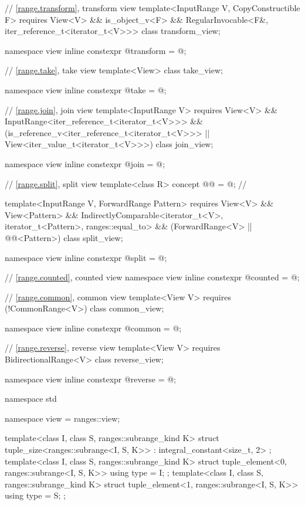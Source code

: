 \begin{codeblock}
{  // \ref{range.transform}, transform view
  template<InputRange V, CopyConstructible F>
    requires View<V> && is_object_v<F> &&
             RegularInvocable<F&, iter_reference_t<iterator_t<V>>>
  class transform_view;

  namespace view { inline constexpr @\unspec@ transform = @\unspec@; }

  // \ref{range.take}, take view
  template<View> class take_view;

  namespace view { inline constexpr @\unspec@ take = @\unspec@; }

  // \ref{range.join}, join view
  template<InputRange V>
    requires View<V> && InputRange<iter_reference_t<iterator_t<V>>> &&
             (is_reference_v<iter_reference_t<iterator_t<V>>> ||
              View<iter_value_t<iterator_t<V>>>)
  class join_view;

  namespace view { inline constexpr @\unspec@ join = @\unspec@; }

  // \ref{range.split}, split view
  template<class R>
    concept @@ = @\seebelow@;   // \expos

  template<InputRange V, ForwardRange Pattern>
    requires View<V> && View<Pattern> &&
             IndirectlyComparable<iterator_t<V>, iterator_t<Pattern>, ranges::equal_to> &&
             (ForwardRange<V> || @@<Pattern>)
  class split_view;

  namespace view { inline constexpr @\unspec@ split = @\unspec@; }

  // \ref{range.counted}, counted view
  namespace view { inline constexpr @\unspec@ counted = @\unspec@; }

  // \ref{range.common}, common view
  template<View V>
    requires (!CommonRange<V>)
  class common_view;

  namespace view { inline constexpr @\unspec@ common = @\unspec@; }

  // \ref{range.reverse}, reverse view
  template<View V>
    requires BidirectionalRange<V>
  class reverse_view;

  namespace view { inline constexpr @\unspec@ reverse = @\unspec@; }
}

namespace std {
  namespace view = ranges::view;

  template<class I, class S, ranges::subrange_kind K>
  struct tuple_size<ranges::subrange<I, S, K>>
    : integral_constant<size_t, 2> {};
  template<class I, class S, ranges::subrange_kind K>
  struct tuple_element<0, ranges::subrange<I, S, K>> {
    using type = I;
  };
  template<class I, class S, ranges::subrange_kind K>
  struct tuple_element<1, ranges::subrange<I, S, K>> {
    using type = S;
  };
}
\end{codeblock}

